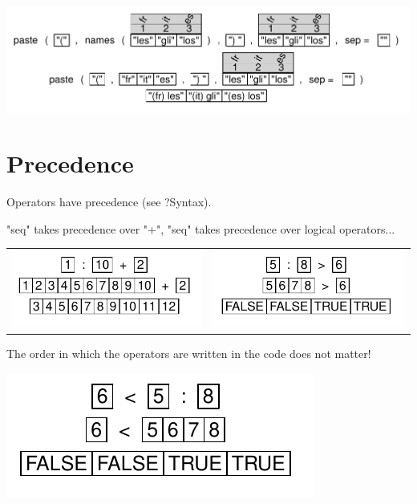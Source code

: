 \documentclass[pdflatex]{article}
\begin{document}
\includegraphics{paste5}

\section{Precedence}

Operators have precedence (see ?Syntax).

"seq" takes precedence over "+", "seq" takes precedence over logical operators...

\begin{tabular}{cc}
\includegraphics{precedence} & \includegraphics{operator_gt}\\
\end{tabular}

The order in which the operators are written in the code does not matter!

\includegraphics{operator_gt_inv}
\end{document}
